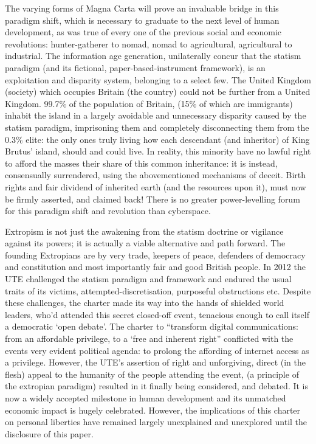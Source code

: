 \documentclass[letterpaper,10pt,openany,oneside,english]{sphinxmanual}
\begin{document}
The varying forms of Magna Carta will prove an invaluable bridge in this paradigm shift, which is necessary to graduate to the next level of human development, as was true of every one of the previous social and economic revolutions: hunter-gatherer to nomad, nomad to agricultural, agricultural to industrial. The information age generation, unilaterally concur that the statism paradigm (and its fictional, paper-based-instrument framework), is an exploitation and disparity system, belonging to a select few. The United Kingdom (society) which occupies Britain (the country) could not be further from a United Kingdom. 99.7\% of the population of Britain, (15\% of which are immigrants) inhabit the island in a largely avoidable and unnecessary disparity caused by the statism paradigm, imprisoning them and completely disconnecting them from the 0.3\% elite: the only ones truly living how each descendant (and inheritor) of King Brutus’ island, should and could live. In reality, this minority have no lawful right to afford the masses their share of this common inheritance: it is instead, consensually surrendered, using the abovementioned mechanisms of deceit. Birth rights and fair dividend of inherited earth (and the resources upon it), must now be firmly asserted, and claimed back! There is no greater power-levelling forum for this paradigm shift and revolution than cyberspace.

Extropism is not just the awakening from the statism doctrine or vigilance against its powers; it is actually a viable alternative and path forward. The founding Extropians are by very trade, keepers of peace, defenders of democracy and constitution and most importantly fair and good British people. In 2012 the UTE challenged the statism paradigm and framework and endured the usual traits of its victims, attempted-discretisation, purposeful obstructions etc. Despite these challenges, the charter made its way into the hands of shielded world leaders, who’d attended this secret closed-off event, tenacious enough to call itself a democratic ‘open debate’. The charter to “transform digital communications: from an affordable privilege, to a ‘free and inherent right” conflicted with the events very evident political agenda: to prolong the affording of internet access as a privilege. However, the UTE’s assertion of right and unforgiving, direct (in the flesh) appeal to the humanity of the people attending the event, (a principle of the extropian paradigm) resulted in it finally being considered, and debated. It is now a widely accepted milestone in human development and its unmatched economic impact is hugely celebrated. However, the implications of this charter on personal liberties have remained largely unexplained and unexplored until the disclosure of this paper.
\end{document}
